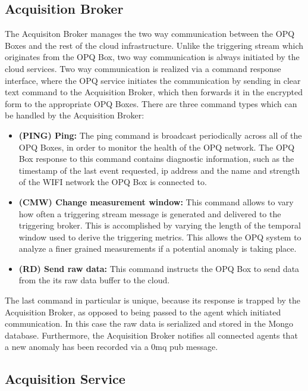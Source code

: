 \subsection{Acquisition Broker}\label{subsec:acquisition-broker}

The Acquisiton Broker manages the two way communication between the OPQ Boxes and the rest of the cloud infrastructure.
Unlike the triggering stream which originates from the OPQ Box, two way communication is always initiated by the cloud services.
Two way communication is realized via a command response interface, where the OPQ service initiates the communication by sending in clear text command to the Acquisition Broker, which then forwards it in the encrypted form to the appropriate OPQ Boxes.
There are three command types which can be handled by the Acquisition Broker:
\begin{itemize}
\item{\textbf{(PING) Ping:}} The ping command is broadcast periodically across all of the OPQ Boxes, in order to monitor the health of the OPQ network.
The OPQ Box response to this command contains diagnostic information, such as the timestamp of the last event requested, ip address and the name and strength of the WIFI network the OPQ Box is connected to.
\item{\textbf{(CMW) Change measurement window:}} This command allows to vary how often a triggering stream message is generated and delivered to the triggering broker.
This is accomplished by varying the length of the temporal window used to derive the triggering metrics.
This allows the OPQ system to analyze a finer grained measurements if a potential anomaly is taking place.

\item{\textbf{(RD) Send raw data:}} This command instructs the OPQ Box to send data from the its raw data buffer to the cloud. 
\end{itemize}

The last command in particular is unique, because its response is trapped by the Acquisition Broker, as opposed to being passed to the agent which initiated communication.
In this case the raw data is serialized and stored in the Mongo database.
Furthermore, the Acquisition Broker notifies all connected agents that a new anomaly has been recorded via a 0mq pub message.

\subsection{Acquisition Service}\label{subsec:acquisition-service}

